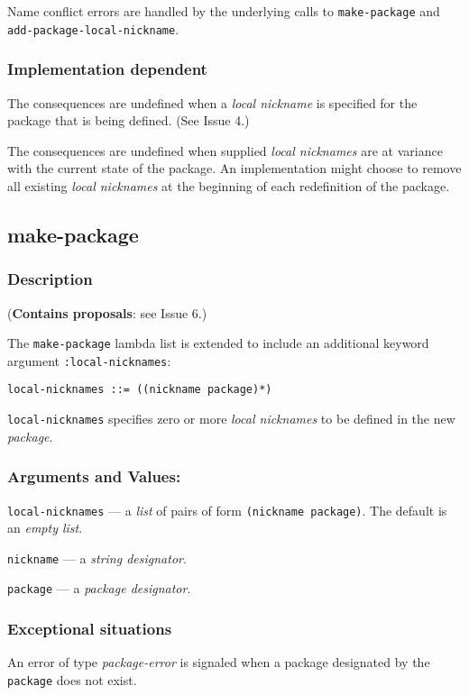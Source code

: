 \documentclass[11pt]{article}
\begin{document}
Name conflict errors are handled by the underlying calls to
\texttt{make-package} and \texttt{add-package-local-nickname}.
\subsubsection{Implementation dependent}
\label{sec:orgd97ee15}
The consequences are undefined when a \emph{local nickname} is specified for the
package that is being defined. (See Issue 4.)

The consequences are undefined when supplied \emph{local nicknames} are at variance
with the current state of the package. An implementation might choose to remove
all existing \emph{local nicknames} at the beginning of each redefinition of the
package.
\subsection{make-package}
\label{sec:org7d2b6a0}
\subsubsection{Description}
\label{sec:orgd7a24a6}
(\textbf{Contains proposals}: see Issue 6.)

The \texttt{make-package} lambda list is extended to include an additional keyword
argument \texttt{:local-nicknames}:
\begin{verbatim}
local-nicknames ::= ((nickname package)*)
\end{verbatim}


\texttt{local-nicknames} specifies zero or more \emph{local nicknames} to be defined in the
new \emph{package}.
\subsubsection{Arguments and Values:}
\label{sec:orgd706418}
\texttt{local-nicknames} --- a \emph{list} of pairs of form \texttt{(nickname package)}.
The default is an \emph{empty list}.

\texttt{nickname} --- a \emph{string designator}.

\texttt{package} --- a \emph{package designator}.
\subsubsection{Exceptional situations}
\label{sec:org9585f49}
An error of type \emph{package-error} is signaled when a package designated by the
\texttt{package} does not exist.
\end{document}
